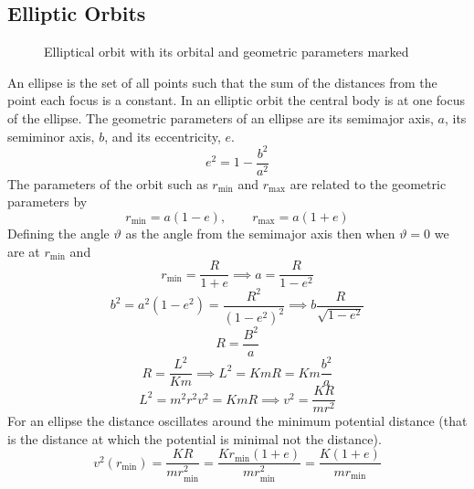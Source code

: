 \documentclass{article}
\begin{document}
    \subsection{Elliptic Orbits}
    \begin{figure}[ht]
        \centering
        \caption{Elliptical orbit with its orbital and geometric parameters marked}
    \end{figure}
    An ellipse is the set of all points such that the sum of the distances from the point each focus is a constant.
    In an elliptic orbit the central body is at one focus of the ellipse.
    The geometric parameters of an ellipse are its semimajor axis, \(a\), its semiminor axis, \(b\), and its eccentricity, \(e\).
    \[e^2 = 1 - \frac{b^2}{a^2}\]
    The parameters of the orbit such as \(r_\text{min}\) and \(r_\text{max}\) are related to the geometric parameters by
    \[r_\text{min} = a(1 - e),\qquad r_\text{max} = a(1 + e)\]
    Defining the angle \(\vartheta\) as the angle from the semimajor axis then when \(\vartheta = 0\) we are at \(r_\text{min}\) and
    \[r_\text{min} = \frac{R}{1 + e}\implies a = \frac{R}{1 - e^2}\]
    \[b^2 = a^2(1 - e^2) = \frac{R^2}{(1 - e^2)^2} \implies b \frac{R}{\sqrt{1 - e^2}}\]
    \[R = \frac{B^2}{a}\]
    \[R = \frac{L^2}{Km}\implies L^2 = KmR = Km\frac{b^2}{a}\]
    \[L^2 = m^2r^2v^2 = KmR \implies v^2 = \frac{KR}{mr^2}\]
    For an ellipse the distance oscillates around the minimum potential distance (that is the distance at which the potential is minimal not the distance).
    \[v^2(r_\text{min}) = \frac{KR}{mr_\text{min}^2} = \frac{Kr_\text{min}(1 + e)}{mr_\text{min}^2} = \frac{K(1 + e)}{mr_\text{min}}\]
\end{document}
